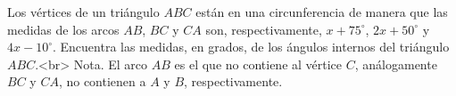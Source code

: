 Los vértices de un triángulo $ABC$ están en una circunferencia de manera que las medidas de los arcos $AB$, $BC$ y $CA$ son, respectivamente, $x + 75^\circ$, $2x + 50^\circ$ y $4x - 10^\circ$. Encuentra las medidas, en grados, de los ángulos internos del triángulo $ABC$.<br>
Nota. El arco $AB$ es el que no contiene al vértice $C$, análogamente $BC$ y $CA$, no contienen a $A$ y $B$, respectivamente.